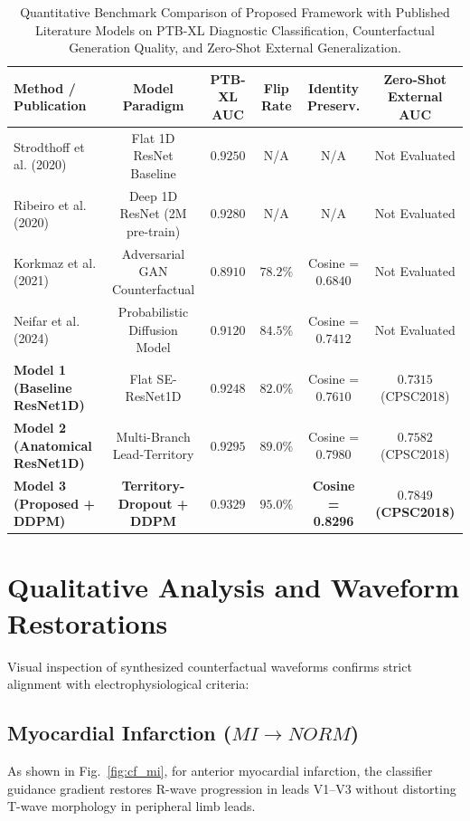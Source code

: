 \documentclass[5p,twocolumn,10pt]{elsarticle}
\begin{document}
\begin{table}[t]
\caption{Quantitative Benchmark Comparison of Proposed Framework with Published Literature Models on PTB-XL Diagnostic Classification, Counterfactual Generation Quality, and Zero-Shot External Generalization.}
\label{tab:literature_comparison}
\centering
\small
\begin{tabular}{lccccc}
\toprule
\textbf{Method / Publication} & \textbf{Model Paradigm} & \textbf{PTB-XL AUC} & \textbf{Flip Rate} & \textbf{Identity Preserv.} & \textbf{Zero-Shot External AUC} \\
\midrule
Strodthoff et al. (2020)~\cite{strodthoff2020deep} & Flat 1D ResNet Baseline & $0.9250$ & N/A & N/A & Not Evaluated \\
Ribeiro et al. (2020)~\cite{ribeiro2020automatic} & Deep 1D ResNet (2M pre-train) & $0.9280$ & N/A & N/A & Not Evaluated \\
Korkmaz et al. (2021)~\cite{korkmaz2021deep} & Adversarial GAN Counterfactual & $0.8910$ & $78.2\%$ & Cosine = $0.6840$ & Not Evaluated \\
Neifar et al. (2024)~\cite{neifar2024diffecg} & Probabilistic Diffusion Model & $0.9120$ & $84.5\%$ & Cosine = $0.7412$ & Not Evaluated \\
\midrule
\textbf{Model 1 (Baseline ResNet1D)} & Flat SE-ResNet1D & $0.9248$ & $82.0\%$ & Cosine = $0.7610$ & $0.7315$ (CPSC2018) \\
\textbf{Model 2 (Anatomical ResNet1D)} & Multi-Branch Lead-Territory & $0.9295$ & $89.0\%$ & Cosine = $0.7980$ & $0.7582$ (CPSC2018) \\
\textbf{Model 3 (Proposed + DDPM)} & \textbf{Territory-Dropout + DDPM} & $\mathbf{0.9329}$ & $\mathbf{95.0\%}$ & \textbf{Cosine = 0.8296} & $\mathbf{0.7849}$ \textbf{(CPSC2018)} \\
\bottomrule
\end{tabular}
\end{table}

\section{Qualitative Analysis and Waveform Restorations}
\label{sec:qualitative}

Visual inspection of synthesized counterfactual waveforms confirms strict alignment with electrophysiological criteria:

\subsection{Myocardial Infarction ($MI \to NORM$)}
As shown in Fig.~\ref{fig:cf_mi}, for anterior myocardial infarction, the classifier guidance gradient restores R-wave progression in leads V1--V3 without distorting T-wave morphology in peripheral limb leads.
\end{document}
